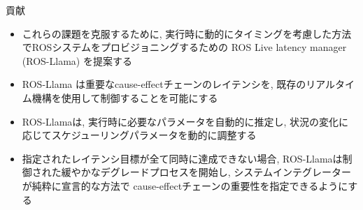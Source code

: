 
\begin{frame}{貢献}
    \begin{itemize}
        \item これらの課題を克服するために, 実行時に動的にタイミングを考慮した方法でROSシステムをプロビジョニングするための ROS Live latency manager (ROS-Llama) を提案する
        \item ROS-Llama は重要なcause-effectチェーンのレイテンシを, 既存のリアルタイム機構を使用して制御することを可能にする
        \item ROS-Llamaは, 実行時に必要なパラメータを自動的に推定し, 状況の変化に応じてスケジューリングパラメータを動的に調整する
        \item 指定されたレイテンシ目標が全て同時に達成できない場合, ROS-Llamaは制御された緩やかなデグレードプロセスを開始し, システムインテグレーターが純粋に宣言的な方法で cause-effectチェーンの重要性を指定できるようにする
    \end{itemize}
\end{frame}





